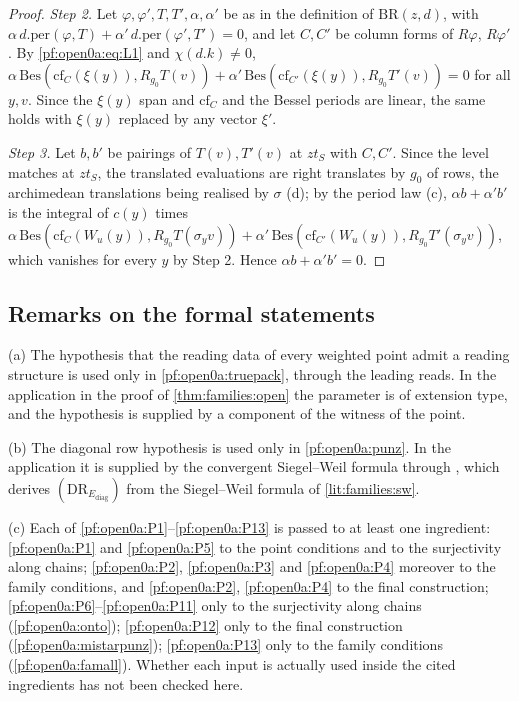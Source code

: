 \begin{proof}
\emph{Step 2.} Let $\varphi,\varphi',T,T',\alpha,\alpha'$ be as in the definition of $\mathrm{BR}(z,d)$, with
$\alpha\,d.\mathrm{per}(\varphi,T)+\alpha'\,d.\mathrm{per}(\varphi',T')=0$, and let $C,C'$ be column forms of $R\varphi$,
$R\varphi'$. By \eqref{pf:open0a:eq:L1} and $\chi(d.k)\ne0$,
$\alpha\,\mathrm{Bes}(\mathrm{cf}_C(\xi(y)),R_{g_0}T(v))+\alpha'\,\mathrm{Bes}(\mathrm{cf}_{C'}(\xi(y)),R_{g_0}T'(v))=0$ for
all $y,v$. Since the $\xi(y)$ span and $\mathrm{cf}_C$ and the Bessel periods are linear, the same holds with $\xi(y)$
replaced by any vector $\xi'$.

\emph{Step 3.} Let $b,b'$ be pairings of $T(v),T'(v)$ at $zt_S$ with $C,C'$. Since the level matches at $zt_S$, the
translated evaluations are right translates by $g_0$ of rows, the archimedean translations being realised by $\sigma$
(d); by the period law (c), $\alpha b+\alpha'b'$ is the integral of $c(y)$ times
$\alpha\,\mathrm{Bes}(\mathrm{cf}_C(W_u(y)),R_{g_0}T(\sigma_yv))+\alpha'\,\mathrm{Bes}(\mathrm{cf}_{C'}(W_u(y)),R_{g_0}T'(\sigma_yv))$,
which vanishes for every $y$ by Step 2. Hence $\alpha b+\alpha'b'=0$.
\end{proof}

\subsection{Remarks on the formal statements}\label{sec:pf:open0a:remarks}

\begin{remark}\label{pf:open0a:rem:hyps}
(a) The hypothesis that the reading data of every weighted point admit a reading structure is used only in
\cref{pf:open0a:truepack}, through the leading reads. In the application in the proof of \cref{thm:families:open} the
parameter is of extension type, and the hypothesis is supplied by a component of the witness of the point.

(b) The diagonal row hypothesis is used only in \cref{pf:open0a:punz}. In the application it is supplied by the
convergent Siegel--Weil formula through , which derives
$(\mathrm{DR}_{E_{\mathrm{diag}}})$ from the Siegel--Weil formula of \cref{lit:families:sw}.

(c) Each of \ref{pf:open0a:P1}--\ref{pf:open0a:P13} is passed to at least one ingredient: \ref{pf:open0a:P1} and
\ref{pf:open0a:P5} to the point conditions and to the surjectivity along chains; \ref{pf:open0a:P2}, \ref{pf:open0a:P3}
and \ref{pf:open0a:P4} moreover to the family conditions, and \ref{pf:open0a:P2}, \ref{pf:open0a:P4} to the final
construction; \ref{pf:open0a:P6}--\ref{pf:open0a:P11} only to the surjectivity along chains (\cref{pf:open0a:onto});
\ref{pf:open0a:P12} only to the final construction (\cref{pf:open0a:mistarpunz}); \ref{pf:open0a:P13} only to the family
conditions (\cref{pf:open0a:famall}). Whether each input is actually used inside the cited ingredients has not been
checked here.
\end{remark}

